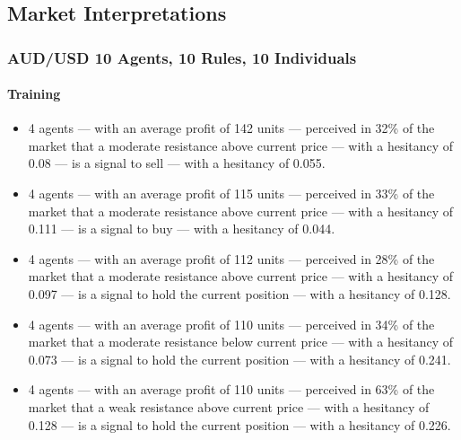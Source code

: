 \chapter{}

\section{Market Interpretations}
\label{app:market-interpretations}

\subsection{AUD/USD 10 Agents, 10 Rules, 10 Individuals}
\label{results:interpretation-aud-usd-10agents-10rules-10individuals}


\subsubsection{Training}

{\small
  \begin{itemize}
  \item 4 agents — with an average profit of 142 units — perceived in 32\% of
    the market that a moderate resistance above current price — with a hesitancy
    of 0.08 — is a signal to sell — with a hesitancy of 0.055.
  \item 4 agents — with an average profit of 115 units — perceived in 33\% of
    the market that a moderate resistance above current price — with a hesitancy
    of 0.111 — is a signal to buy — with a hesitancy of 0.044.
  \item 4 agents — with an average profit of 112 units — perceived in 28\% of
    the market that a moderate resistance above current price — with a hesitancy
    of 0.097 — is a signal to hold the current position — with a hesitancy of
    0.128.
  \item 4 agents — with an average profit of 110 units — perceived in 34\% of
    the market that a moderate resistance below current price — with a hesitancy
    of 0.073 — is a signal to hold the current position — with a hesitancy of
    0.241.
  \item 4 agents — with an average profit of 110 units — perceived in 63\% of
    the market that a weak resistance above current price — with a hesitancy of
    0.128 — is a signal to hold the current position — with a hesitancy of
    0.226.
  \end{itemize}
}

